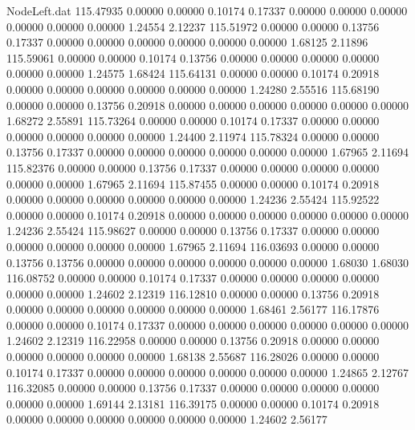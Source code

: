 \begin{filecontents}{NodeLeft.dat}
 115.47935    0.00000    0.00000     0.10174    0.17337    0.00000    0.00000    0.00000    0.00000    0.00000    0.00000    1.24554    2.12237
 115.51972    0.00000    0.00000     0.13756    0.17337    0.00000    0.00000    0.00000    0.00000    0.00000    0.00000    1.68125    2.11896
 115.59061    0.00000    0.00000     0.10174    0.13756    0.00000    0.00000    0.00000    0.00000    0.00000    0.00000    1.24575    1.68424
 115.64131    0.00000    0.00000     0.10174    0.20918    0.00000    0.00000    0.00000    0.00000    0.00000    0.00000    1.24280    2.55516
 115.68190    0.00000    0.00000     0.13756    0.20918    0.00000    0.00000    0.00000    0.00000    0.00000    0.00000    1.68272    2.55891
 115.73264    0.00000    0.00000     0.10174    0.17337    0.00000    0.00000    0.00000    0.00000    0.00000    0.00000    1.24400    2.11974
 115.78324    0.00000    0.00000     0.13756    0.17337    0.00000    0.00000    0.00000    0.00000    0.00000    0.00000    1.67965    2.11694
 115.82376    0.00000    0.00000     0.13756    0.17337    0.00000    0.00000    0.00000    0.00000    0.00000    0.00000    1.67965    2.11694
 115.87455    0.00000    0.00000     0.10174    0.20918    0.00000    0.00000    0.00000    0.00000    0.00000    0.00000    1.24236    2.55424
 115.92522    0.00000    0.00000     0.10174    0.20918    0.00000    0.00000    0.00000    0.00000    0.00000    0.00000    1.24236    2.55424
 115.98627    0.00000    0.00000     0.13756    0.17337    0.00000    0.00000    0.00000    0.00000    0.00000    0.00000    1.67965    2.11694
 116.03693    0.00000    0.00000     0.13756    0.13756    0.00000    0.00000    0.00000    0.00000    0.00000    0.00000    1.68030    1.68030
 116.08752    0.00000    0.00000     0.10174    0.17337    0.00000    0.00000    0.00000    0.00000    0.00000    0.00000    1.24602    2.12319
 116.12810    0.00000    0.00000     0.13756    0.20918    0.00000    0.00000    0.00000    0.00000    0.00000    0.00000    1.68461    2.56177
 116.17876    0.00000    0.00000     0.10174    0.17337    0.00000    0.00000    0.00000    0.00000    0.00000    0.00000    1.24602    2.12319
 116.22958    0.00000    0.00000     0.13756    0.20918    0.00000    0.00000    0.00000    0.00000    0.00000    0.00000    1.68138    2.55687
 116.28026    0.00000    0.00000     0.10174    0.17337    0.00000    0.00000    0.00000    0.00000    0.00000    0.00000    1.24865    2.12767
 116.32085    0.00000    0.00000     0.13756    0.17337    0.00000    0.00000    0.00000    0.00000    0.00000    0.00000    1.69144    2.13181
 116.39175    0.00000    0.00000     0.10174    0.20918    0.00000    0.00000    0.00000    0.00000    0.00000    0.00000    1.24602    2.56177

\end{filecontents}
